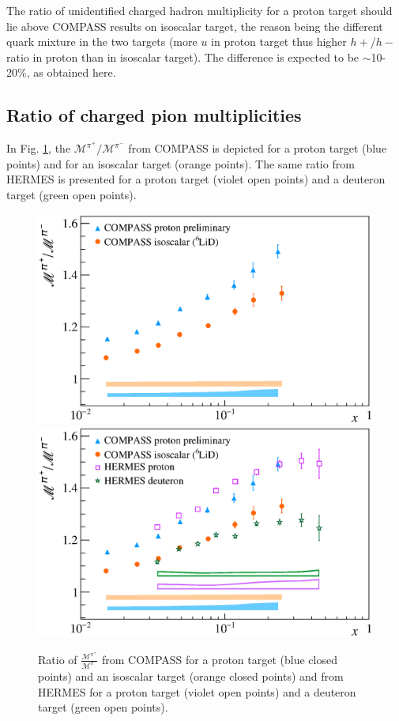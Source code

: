 The ratio of unidentified charged hadron multiplicity for a proton target should lie above COMPASS results on isoscalar target, the reason being the different quark mixture in the two targets (more $u$ in proton target thus higher $h+$/$h-$ ratio in proton than in isoscalar target). The difference is expected to be $\sim$10-20\%, as obtained here.

\newpage

\subsection{Ratio of charged pion multiplicities}

In Fig. \ref{pic:piratio}, the $\mathscr{M}^{\pi^+}/\mathscr{M}^{\pi^-}$ from COMPASS is depicted for a proton target (blue points) and for an isoscalar target (orange points). The same ratio from HERMES is presented for a proton target (violet open points) and a deuteron target (green open points).

\begin{figure}[!h]
  \centering
	\includegraphics[scale=0.5]{./gfx/Mult_pi_ratio_noH.eps}
	\includegraphics[scale=0.5]{./gfx/Mult_pi_ratio.eps}
	\caption{Ratio of $\frac{\mathscr{M}^{\pi^+}}{\mathscr{M}^{\pi^-}}$ from COMPASS for a proton target (blue closed points) and an isoscalar target (orange closed points) and from HERMES for a proton target (violet open points) and a deuteron target (green open points).}
	\label{pic:piratio}
\end{figure}

